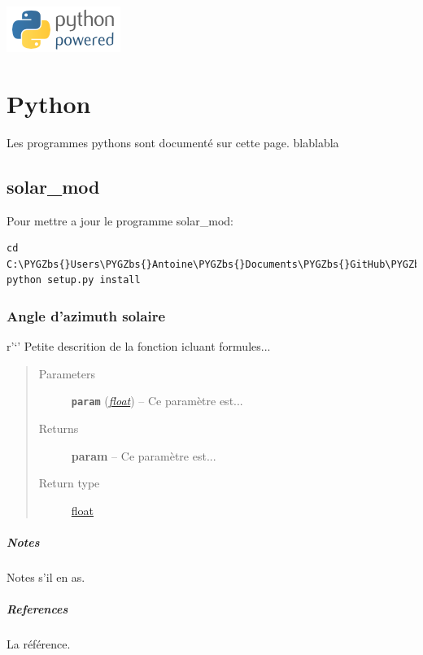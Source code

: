 \documentclass[letterpaper,10pt,english]{sphinxmanual}
\def\PYGZbs{\char`\\}
\def\PYGZus{\char`\_}
\begin{document}
{\hfill\includegraphics{python-powered.png}}


\chapter{Python}
\label{python::doc}\label{python:python}
Les programmes pythons sont documenté sur cette page. blablabla
\label{python:module-solar_mod}

\section{solar\_mod}
\label{python:solar-mod}
Pour mettre a jour le programme solar\_mod:

\begin{Verbatim}[commandchars=\\\{\}]
cd C:\PYGZbs{}Users\PYGZbs{}Antoine\PYGZbs{}Documents\PYGZbs{}GitHub\PYGZbs{}Solar\PYGZus{}mod
python setup.py install
\end{Verbatim}


\subsection{Angle d'azimuth solaire}
\label{python:angle-d-azimuth-solaire}

\begin{fulllineitems}
\label{python:solar_mod.azimuth_solaire}
r'`' Petite descrition de la fonction icluant formules...
\begin{quote}\begin{description}
\item[{Parameters}] \leavevmode
\textbf{\texttt{param}} (\href{https://docs.python.org/library/functions.html\#float}{\emph{float}}) -- Ce paramètre est...

\item[{Returns}] \leavevmode
\textbf{param} -- Ce paramètre est...

\item[{Return type}] \leavevmode
\href{https://docs.python.org/library/functions.html\#float}{float}

\end{description}\end{quote}
\paragraph{Notes}

Notes s'il en as.
\paragraph{References}

La référence.

\end{fulllineitems}
\end{document}
